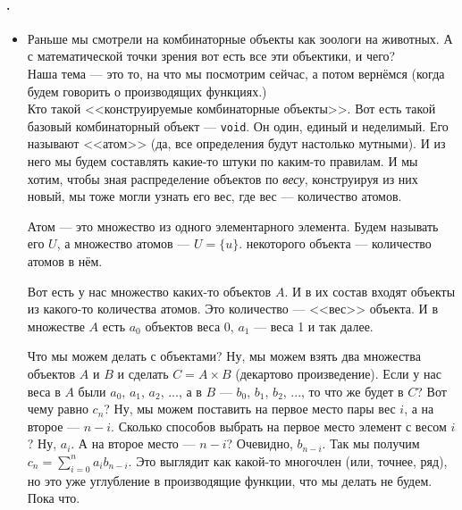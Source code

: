 \documentclass{article}
\begin{document}
    \paragraph{.}
    \begin{itemize}
        \item[]
        \begin{Comment}
            Раньше мы смотрели на комбинаторные объекты как зоологи на животных. А с математической точки зрения вот есть все эти объектики, и чего?\\
            Наша тема --- это то, на что мы посмотрим сейчас, а потом вернёмся (когда будем говорить о производящих функциях.)\\
            Кто такой <<конструируемые комбинаторные объекты>>. Вот есть такой базовый комбинаторный объект --- \texttt{void}. Он один, единый и неделимый. Его называют <<атом>> (да, все определения будут настолько мутными). И из него мы будем составлять какие-то штуки по каким-то правилам. И мы хотим, чтобы зная распределение объектов по \textit{весу}, конструируя из них новый, мы тоже могли узнать его вес, где вес --- количество атомов.
        \end{Comment}
        \dfn Атом --- это множество из одного элементарного элемента. Будем называть его $U$, а множество атомов --- $U=\{u\}$.
        \dfn {} некоторого объекта --- количество атомов в нём.
        \begin{Comment}
            Вот есть у нас множество каких-то объектов $A$. И в их состав входят объекты из какого-то количества атомов. Это количество --- <<вес>> объекта. И в множестве $A$ есть $a_0$ объектов веса 0, $a_1$ --- веса 1 и так далее.
        \end{Comment}
        \begin{Comment}
            Что мы можем делать с объектами? Ну, мы можем взять два множества объектов $A$ и $B$ и сделать $C=A\times B$ (декартово произведение). Если у нас веса в $A$ были $a_0$, $a_1$, $a_2$, ..., а в $B$ --- $b_0$, $b_1$, $b_2$, ..., то что же будет в $C$? Вот чему равно $c_n$? Ну, мы можем поставить на первое место пары вес $i$, а на второе --- $n-i$. Сколько способов выбрать на первое место элемент с весом $i$? Ну, $a_i$. А на второе место --- $n-i$? Очевидно, $b_{n-i}$. Так мы получим $c_n=\sum_{i=0}^na_ib_{n-i}$. Это выглядит как какой-то многочлен (или, точнее, ряд), но это уже углубление в производящие функции, что мы делать не будем. Пока что.\\

\end{Comment}
\end{itemize}
\end{document}
